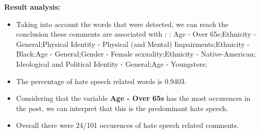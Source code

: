\documentclass[11pt]{article}
\begin{document}
\textbf{\Large Result analysis:}

\begin{itemize}\item Taking into account the words that were detected, we can reach the conclusion these comments are associated with : : Age - Over 65s;Ethnicity - General;Physical Identity - Physical (and Mental) Impairments;Ethnicity - Black;Age - General;Gender - Female sexuality;Ethnicity - Native-American; Ideological and Political Identity - General;Age - Youngsters;%

\item The percentage of hate speech related words is 0.9403.

\item Considering that the variable \textbf{Age - Over 65s} has the most occurences in the post, we can interpret that this is the predominant hate speech.

\item Overall there were 24/101 occurences of hate speech related comments.\end{itemize}
\end{document}

